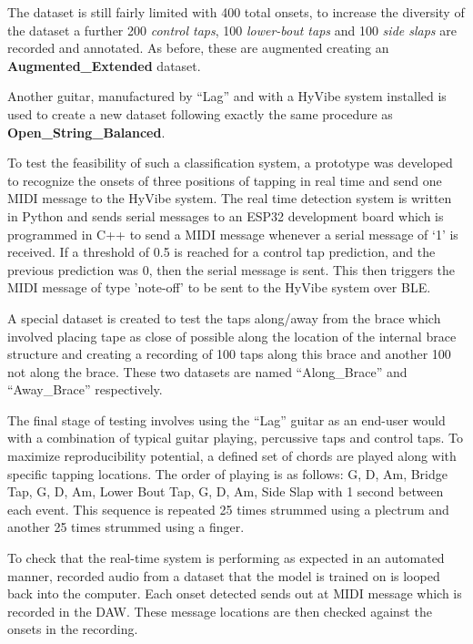 \documentclass[conference]{IEEEtran}
\begin{document}
The dataset is still fairly limited with 400 total onsets, to increase the diversity of the dataset a further 200 \emph{control taps}, 100 \emph{lower-bout taps} and 100 \emph{side slaps} are recorded and annotated. As before, these are augmented creating an \textbf{Augmented\_Extended} dataset. 

Another guitar, manufactured by ``Lag'' and with a HyVibe system installed is used to create a new dataset following exactly the same procedure as \textbf{Open\_String\_Balanced}.

To test the feasibility of such a classification system, a prototype was developed to recognize the onsets of three positions of tapping in real time and send one MIDI message to the HyVibe system.
The real time detection system is written in Python and sends serial messages to an ESP32 development board which is programmed in C++ to send a MIDI message whenever a serial
message of `1' is received. If a threshold of 0.5 is reached for a control tap prediction, and the previous prediction was 0, then the serial message is sent.
This then triggers the MIDI message of type 'note-off' to be sent to the HyVibe system over BLE.

A special dataset is created to test the taps along/away from the brace which involved placing tape as close of possible along the location of the internal brace structure and creating a recording of 100 taps along this brace and another 100 not along the 
brace. These two datasets are named ``Along\_Brace'' and ``Away\_Brace'' respectively.

The final stage of testing involves using the ``Lag'' guitar as an end-user would with a combination of typical guitar playing, percussive taps and control taps. 
To maximize reproducibility potential, a defined set of chords are played along with specific tapping locations. The order of playing is as follows: G, D, Am, Bridge Tap, G, D, Am, Lower Bout Tap, G, D, Am, Side Slap with 1 second between each event. This sequence is repeated 25 times strummed using a 
plectrum and another 25 times strummed using a finger.

To check that the real-time system is performing as expected in an automated manner, recorded audio from a dataset that the model is trained on is looped back into the computer. Each onset detected sends out at MIDI message which is recorded in the DAW. These message locations
are then checked against the onsets in the recording.
\end{document}
